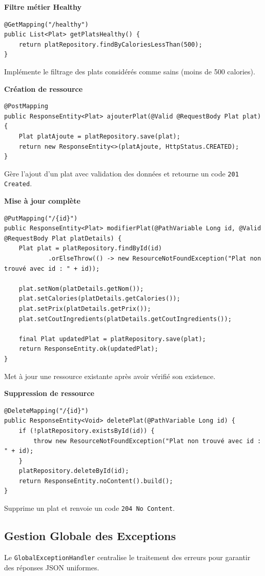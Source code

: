 \documentclass[12pt,a4paper,french]{article}
\begin{document}
\vspace{1em}
\textbf{Filtre métier Healthy}
\begin{verbatim}
@GetMapping("/healthy")
public List<Plat> getPlatsHealthy() {
    return platRepository.findByCaloriesLessThan(500);
}
\end{verbatim}
Implémente le filtrage des plats considérés comme sains (moins de 500 calories).

\vspace{1em}
\textbf{Création de ressource}
\begin{verbatim}
@PostMapping
public ResponseEntity<Plat> ajouterPlat(@Valid @RequestBody Plat plat) {
    Plat platAjoute = platRepository.save(plat);
    return new ResponseEntity<>(platAjoute, HttpStatus.CREATED);
}
\end{verbatim}
Gère l'ajout d'un plat avec validation des données et retourne un code \texttt{201 Created}.

\vspace{1em}
\textbf{Mise à jour complète}
\begin{verbatim}
@PutMapping("/{id}")
public ResponseEntity<Plat> modifierPlat(@PathVariable Long id, @Valid @RequestBody Plat platDetails) {
    Plat plat = platRepository.findById(id)
            .orElseThrow(() -> new ResourceNotFoundException("Plat non trouvé avec id : " + id));

    plat.setNom(platDetails.getNom());
    plat.setCalories(platDetails.getCalories());
    plat.setPrix(platDetails.getPrix());
    plat.setCoutIngredients(platDetails.getCoutIngredients());

    final Plat updatedPlat = platRepository.save(plat);
    return ResponseEntity.ok(updatedPlat);
}
\end{verbatim}
Met à jour une ressource existante après avoir vérifié son existence.

\vspace{1em}
\textbf{Suppression de ressource}
\begin{verbatim}
@DeleteMapping("/{id}")
public ResponseEntity<Void> deletePlat(@PathVariable Long id) {
    if (!platRepository.existsById(id)) {
        throw new ResourceNotFoundException("Plat non trouvé avec id : " + id);
    }
    platRepository.deleteById(id);
    return ResponseEntity.noContent().build();
}
\end{verbatim}
Supprime un plat et renvoie un code \texttt{204 No Content}.

\subsection{Gestion Globale des Exceptions}
Le \texttt{GlobalExceptionHandler} centralise le traitement des erreurs pour garantir des réponses
JSON uniformes.
\end{document}

